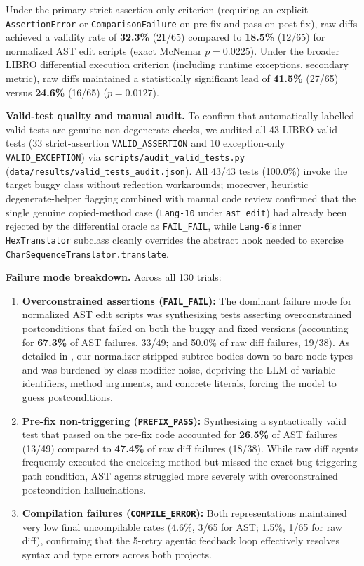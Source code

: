 \documentclass[12pt, a4paper]{article}
\begin{document}
Under the primary strict assertion-only criterion (requiring an explicit \texttt{AssertionError} or \texttt{ComparisonFailure} on pre-fix and pass on post-fix), raw diffs achieved a validity rate of \textbf{32.3\%} (21/65) compared to \textbf{18.5\%} (12/65) for normalized AST edit scripts (exact McNemar $p = 0.0225$).
Under the broader LIBRO differential execution criterion (including runtime exceptions, secondary metric), raw diffs maintained a statistically significant lead of \textbf{41.5\%} (27/65) versus \textbf{24.6\%} (16/65) ($p = 0.0127$).

\textbf{Valid-test quality and manual audit.}
To confirm that automatically labelled valid tests are genuine non-degenerate checks, we audited all 43 LIBRO-valid tests (33 strict-assertion \texttt{VALID\_ASSERTION} and 10 exception-only \texttt{VALID\_EXCEPTION}) via \texttt{scripts/audit\_valid\_tests.py} (\texttt{data/results/valid\_tests\_audit.json}).
All 43/43 tests (100.0\%) invoke the target buggy class without reflection workarounds; moreover, heuristic degenerate-helper flagging combined with manual code review confirmed that the single genuine copied-method case (\texttt{Lang-10} under \texttt{ast\_edit}) had already been rejected by the differential oracle as \texttt{FAIL\_FAIL}, while \texttt{Lang-6}'s inner \texttt{HexTranslator} subclass cleanly overrides the abstract hook needed to exercise \texttt{CharSequenceTranslator.translate}.

\textbf{Failure mode breakdown.}
Across all 130 trials:
\begin{enumerate}[leftmargin=*]
  \item \textbf{Overconstrained assertions (\texttt{FAIL\_FAIL}):} The dominant failure mode for normalized AST edit scripts was synthesizing tests asserting overconstrained postconditions that failed on both the buggy and fixed versions (accounting for \textbf{67.3\%} of AST failures, 33/49; and 50.0\% of raw diff failures, 19/38). As detailed in , our normalizer stripped subtree bodies down to bare node types and was burdened by class modifier noise, depriving the LLM of variable identifiers, method arguments, and concrete literals, forcing the model to guess postconditions.
  \item \textbf{Pre-fix non-triggering (\texttt{PREFIX\_PASS}):} Synthesizing a syntactically valid test that passed on the pre-fix code accounted for \textbf{26.5\%} of AST failures (13/49) compared to \textbf{47.4\%} of raw diff failures (18/38). While raw diff agents frequently executed the enclosing method but missed the exact bug-triggering path condition, AST agents struggled more severely with overconstrained postcondition hallucinations.
  \item \textbf{Compilation failures (\texttt{COMPILE\_ERROR}):} Both representations maintained very low final uncompilable rates (4.6\%, 3/65 for AST; 1.5\%, 1/65 for raw diff), confirming that the 5-retry agentic feedback loop effectively resolves syntax and type errors across both projects.
\end{enumerate}
\end{document}

